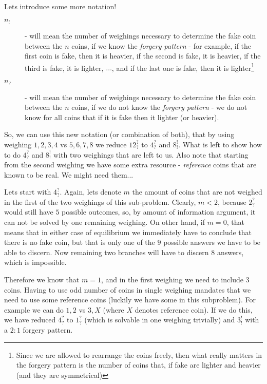 \begin{problem}
Lets introduce some more notation!
\begin{description}
\item[$n_!$] - will mean the number of weighings necessary to determine the fake coin between the $n$ coins, if we know the \textit{forgery pattern} - for example, if the first coin is fake, then it is heavier, if the second is fake, it is heavier, if the third is fake, it is lighter, $\dots$,  and if the last one is fake, then it is lighter\footnote{Since we are allowed to rearrange the coins freely, then what really matters in the forgery pattern is the number of coins that, if fake are lighter and heavier (and they are symmetrical)} 
\item[$n_?$] - will mean the number of weighings necessary to determine the fake coin between the $n$ coins, if we do not know the \textit{forgery pattern} - we do not know for all coins that if it is fake then it lighter (or heavier). 
\end{description}

So, we can use this new notation (or combination of both), that by using weighing $1,2,3,4$ vs $5,6,7,8$ we reduce $12^?_?$ to $4^?_?$ and $8^!_!$. What is left to show how to do $4^?_?$ and $8^!_!$ with two weighings that are left to us. Also note that starting from the second weighing we have some extra resource - \textit{reference} coins that are known to be real. We might need them...

Lets start with $4^?_?$. Again, lets denote $m$ the amount of coins that are not weighed in the first of the two weighings of this sub-problem. Clearly, $m<2$, because $2^?_?$ would still have $5$ possible outcomes, so, by amount of information argument, it can not be solved by one remaining weighing.  On other hand, if $m=0$, that means that in either case of equilibrium we immediately have to conclude that there is no fake coin, but that is only one of the $9$ possible answers we have to be able to discern. Now remaining two branches will have to discern $8$ answers, which is impossible. 

Therefore we know that $m=1$, and in the first weighing we need to include $3$ coins.  Having to use odd number of coins in single weighing mandates that we need to use some reference coins (luckily we have some in this subproblem). For example we can do $1,2$ vs $3,X$ (where $X$ denotes reference coin). If we do this, we have reduced $4^?_?$ to $1^?_?$ (which is solvable in one weighing trivially) and $3^!_!$ with a $2:1$ forgery pattern.


\end{problem}
